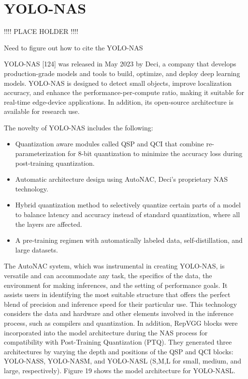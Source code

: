 \documentclass{article}
\begin{document}
\section{YOLO-NAS}

!!!! PLACE HOLDER !!!!

Need to figure out how to cite the YOLO-NAS

YOLO-NAS [124] was released in May 2023 by Deci, a company that develops production-grade models and tools to build, optimize, and deploy deep learning models. YOLO-NAS is designed to detect small objects, improve localization accuracy, and enhance the performance-per-compute ratio, making it suitable for real-time edge-device applications. In addition, its open-source architecture is available for research use.

The novelty of YOLO-NAS includes the following:

\begin{itemize}
    \item Quantization aware modules \cite{chu2024make} called QSP and QCI that combine re-parameterization for 8-bit quantization to minimize the accuracy loss during post-training quantization.
    \item Automatic architecture design using AutoNAC, Deci’s proprietary NAS technology.
    \item Hybrid quantization method to selectively quantize certain parts of a model to balance latency and accuracy instead of standard quantization, where all the layers are affected.
    \item A pre-training regimen with automatically labeled data, self-distillation, and large datasets.
\end{itemize}


The AutoNAC system, which was instrumental in creating YOLO-NAS, is versatile and can accommodate any task, the specifics of the data, the environment for making inferences, and the setting of performance goals. It assists users in identifying the most suitable structure that offers the perfect blend of precision and inference speed for their particular use. This technology considers the data and hardware and other elements involved in the inference process, such as compilers and quantization. In addition, RepVGG blocks were incorporated into the model architecture during the NAS process for compatibility with Post-Training Quantization (PTQ). They generated three architectures by varying the depth and positions of the QSP and QCI blocks: YOLO-NASS, YOLO-NASM, and YOLO-NASL (S,M,L for small, medium, and large, respectively). Figure 19 shows the model architecture for YOLO-NASL.
\end{document}
